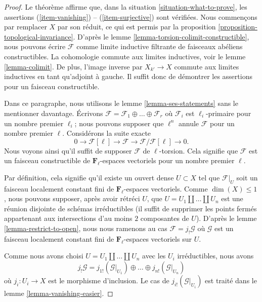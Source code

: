 \begin{proof}
Le théorème affirme que, dans la situation \ref{situation-what-to-prove},
les assertions (\ref{item-vanishing}) -- (\ref{item-surjective}) sont vérifiées.
Nous commençons par remplacer $X$ par son réduit, ce qui est permis
par la proposition \ref{proposition-topological-invariance}.
D'après le lemme \ref{lemma-torsion-colimit-constructible}, nous pouvons écrire
$\mathcal{F}$ comme limite inductive filtrante de faisceaux abéliens constructibles.
La cohomologie commute aux limites inductives, voir le lemme \ref{lemma-colimit}.
De plus, l'image inverse par $X_{k'} \to X$ commute aux limites inductives en tant
qu'adjoint à gauche. Il suffit donc de démontrer les assertions pour un faisceau constructible.

\medskip\noindent
Dans ce paragraphe, nous utilisons le lemme \ref{lemma-ses-statements} sans le
mentionner davantage. Écrivons
$\mathcal{F} = \mathcal{F}_1 \oplus \ldots \oplus \mathcal{F}_r$
où $\mathcal{F}_i$ est $\ell_i$-primaire pour un nombre premier $\ell_i$; nous pouvons
supposer que $\ell^n$ annule $\mathcal{F}$ pour un nombre premier $\ell$. Considérons la
suite exacte
$$
0 \to \mathcal{F}[\ell] \to \mathcal{F} \to \mathcal{F}/\mathcal{F}[\ell] \to 0.
$$
Nous voyons ainsi qu'il suffit de supposer $\mathcal{F}$ de $\ell$-torsion.
Cela signifie que $\mathcal{F}$ est un faisceau constructible de
$\mathbf{F}_\ell$-espaces vectoriels pour un nombre premier $\ell$.

\medskip\noindent
Par définition, cela signifie qu'il existe un ouvert dense $U \subset X$
tel que $\mathcal{F}|_U$ soit un faisceau localement constant fini de
$\mathbf{F}_\ell$-espaces vectoriels. Comme $\dim(X) \leq 1$, nous pouvons
supposer, après avoir rétréci $U$, que $U = U_1 \amalg \ldots \amalg U_n$
est une réunion disjointe de schémas irréductibles (il suffit de supprimer les points
fermés appartenant aux intersections d'au moins $2$ composantes de $U$).
D'après le lemme \ref{lemma-restrict-to-open}, nous nous ramenons au cas
$\mathcal{F} = j_!\mathcal{G}$ où $\mathcal{G}$ est un faisceau
localement constant fini de $\mathbf{F}_\ell$-espaces vectoriels sur $U$.

\medskip\noindent
Comme nous avons choisi $U = U_1 \amalg \ldots \amalg U_n$ avec les $U_i$ irréductibles,
nous avons
$$
j_!\mathcal{G} =
j_{1!}(\mathcal{G}|_{U_1}) \oplus \ldots \oplus
j_{n!}(\mathcal{G}|_{U_n})
$$
où $j_i : U_i \to X$ est le morphisme d'inclusion.
Le cas de $j_{i!}(\mathcal{G}|_{U_i})$ est traité dans le
lemme \ref{lemma-vanishing-easier}.
\end{proof}

